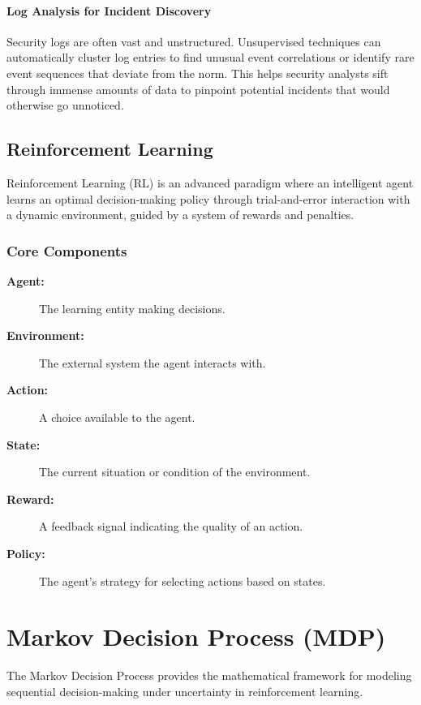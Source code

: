 \documentclass[16pt]{report}
\begin{document}
\paragraph{Log Analysis for Incident Discovery}
Security logs are often vast and unstructured. Unsupervised techniques can automatically cluster log entries to find unusual event correlations or identify rare event sequences that deviate from the norm. This helps security analysts sift through immense amounts of data to pinpoint potential incidents that would otherwise go unnoticed.

\subsection{Reinforcement Learning}
Reinforcement Learning (RL) is an advanced paradigm where an intelligent agent learns an optimal decision-making policy through trial-and-error interaction with a dynamic environment, guided by a system of rewards and penalties.

\subsubsection{Core Components}
\begin{description}
    \item[\textbf{Agent:}] The learning entity making decisions.
    \item[\textbf{Environment:}] The external system the agent interacts with.
    \item[\textbf{Action:}] A choice available to the agent.
    \item[\textbf{State:}] The current situation or condition of the environment.
    \item[\textbf{Reward:}] A feedback signal indicating the quality of an action.
    \item[\textbf{Policy:}] The agent's strategy for selecting actions based on states.
\end{description}

\section{Markov Decision Process (MDP)}
The Markov Decision Process provides the mathematical framework for modeling sequential decision-making under uncertainty in reinforcement learning.
\end{document}

